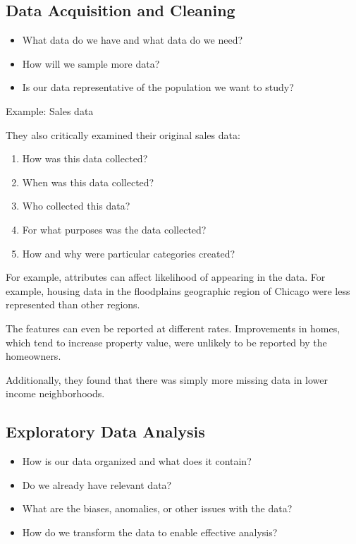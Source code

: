 \documentclass[
  letterpaper,
  DIV=11,
  numbers=noendperiod]{scrreprt}
\providecommand{\tightlist}{%
  \setlength{\itemsep}{0pt}\setlength{\parskip}{0pt}}\usepackage{longtable,booktabs,array}
\begin{document}
\hypertarget{data-acquisition-and-cleaning}{%
\subsection{Data Acquisition and
Cleaning}\label{data-acquisition-and-cleaning}}

\begin{itemize}
\tightlist
\item
  What data do we have and what data do we need?
\item
  How will we sample more data?
\item
  Is our data representative of the population we want to study?
\end{itemize}

Example: Sales data

They also critically examined their original sales data:

\begin{enumerate}
\def\labelenumi{\arabic{enumi}.}
\tightlist
\item
  How was this data collected?
\item
  When was this data collected?
\item
  Who collected this data?
\item
  For what purposes was the data collected?
\item
  How and why were particular categories created?
\end{enumerate}

For example, attributes can affect likelihood of appearing in the data.
For example, housing data in the floodplains geographic region of
Chicago were less represented than other regions.

The features can even be reported at different rates. Improvements in
homes, which tend to increase property value, were unlikely to be
reported by the homeowners.

Additionally, they found that there was simply more missing data in
lower income neighborhoods.

\hypertarget{exploratory-data-analysis}{%
\subsection{Exploratory Data Analysis}\label{exploratory-data-analysis}}

\begin{itemize}
\tightlist
\item
  How is our data organized and what does it contain?
\item
  Do we already have relevant data?
\item
  What are the biases, anomalies, or other issues with the data?
\item
  How do we transform the data to enable effective analysis?
\end{itemize}
\end{document}
